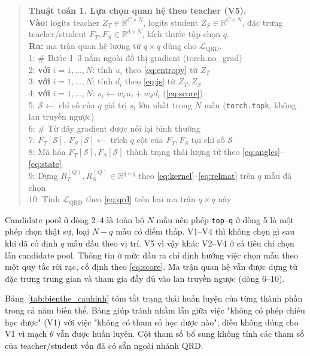 \begin{quote}
\ttfamily\small\raggedright
\noindent\textbf{Thuật toán 1. Lựa chọn quan hệ theo teacher (V5).}\\[2pt]
\textbf{Vào:} logits teacher $Z_T \in \mathbb{R}^{C \times N}$, logits
student $Z_S \in \mathbb{R}^{C \times N}$, đặc trưng teacher/student
$F_T, F_S \in \mathbb{R}^{d \times N}$, kích thước tập chọn $q$.\\
\textbf{Ra:} ma trận quan hệ lượng tử $q \times q$ dùng cho
$\mathcal{L}_{\mathrm{QRD}}$.\\[4pt]
1: \quad \# Bước 1--3 nằm ngoài đồ thị gradient (torch.no\_grad)\\
2: \quad \textbf{với} $i = 1,\ldots,N$: tính $u_i$ theo \eqref{eq:entropy} từ
$Z_T$\\
3: \quad \textbf{với} $i = 1,\ldots,N$: tính $d_i$ theo \eqref{eq:js} từ
$Z_T, Z_S$\\
4: \quad \textbf{với} $i = 1,\ldots,N$: $s_i \leftarrow w_e u_i + w_d d_i$
(\eqref{eq:score})\\
5: \quad $\mathcal{S} \leftarrow$ chỉ số của $q$ giá trị $s_i$ lớn nhất trong
$N$ mẫu (\texttt{torch.topk}, không lan truyền ngược)\\[4pt]
6: \quad \# Từ đây gradient được nối lại bình thường\\
7: \quad $F_T[\mathcal{S}],\, F_S[\mathcal{S}] \leftarrow$ trích $q$ cột của
$F_T, F_S$ tại chỉ số $\mathcal{S}$\\
8: \quad Mã hóa $F_T[\mathcal{S}], F_S[\mathcal{S}]$ thành trạng thái lượng
tử theo \eqref{eq:angles}--\eqref{eq:state}\\
9: \quad Dựng $R_T^{(Q)}, R_S^{(Q)} \in \mathbb{R}^{q \times q}$ theo
\eqref{eq:kernel}--\eqref{eq:relmat} trên $q$ mẫu đã chọn\\
10: \quad Tính $\mathcal{L}_{\mathrm{QRD}}$ theo \eqref{eq:qrd} trên hai ma
trận $q \times q$ này
\end{quote}

Candidate pool ở dòng 2--4 là toàn bộ $N$ mẫu nên phép \texttt{top-q} ở
dòng 5 là một phép chọn thật sự, loại $N - q$ mẫu có điểm thấp. V1--V4 thì
không chọn gì sau khi đã cố định $q$ mẫu đầu theo vị trí. V5 vì vậy khác
V2--V4 ở cả tiêu chí chọn lẫn candidate pool. Thông tin ở mức đầu ra chỉ
định hướng việc chọn mẫu theo một quy tắc rời rạc, cố định theo
\eqref{eq:score}. Ma trận quan hệ vẫn được dựng từ đặc trưng trung gian và
tham gia đầy đủ vào lan truyền ngược (dòng 6--10).

Bảng~\ref{tab:bienthe_cauhinh} tóm tắt trạng thái huấn luyện của từng thành phần trong cả năm biến thể. Bảng giúp tránh nhầm lẫn giữa việc "không có phép chiếu học được" (V1) với việc "không có tham số học được nào", điều không đúng cho V1 vì mạch $\theta$ vẫn được huấn luyện. Cột tham số bổ sung không tính các
tham số của teacher/student vốn đã có sẵn ngoài nhánh QRD.

